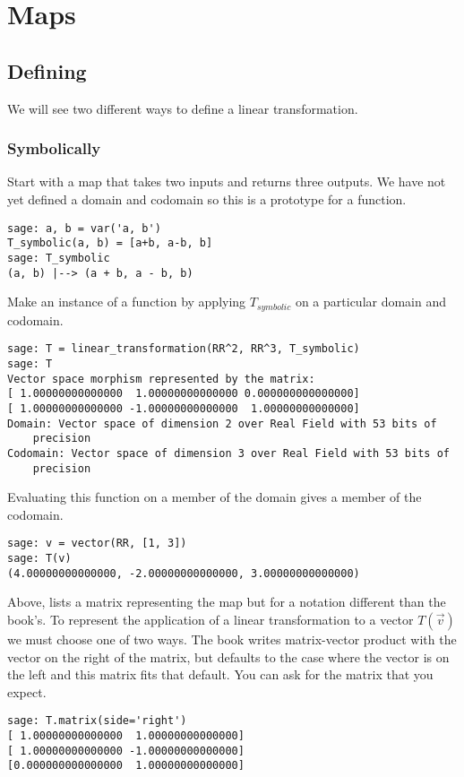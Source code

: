 \chapter{Maps}




\section{Defining}
We will see two different ways to define a linear transformation.

\subsection{Symbolically}
Start with a map that takes two inputs and returns three outputs.
We have not yet defined a domain and codomain 
so this is a prototype for a function.
\begin{lstlisting}
sage: a, b = var('a, b')   
T_symbolic(a, b) = [a+b, a-b, b]         
sage: T_symbolic       
(a, b) |--> (a + b, a - b, b)                
\end{lstlisting}
Make an instance of a function by applying $T_{\textit{symbolic}}$ on a 
particular domain and codomain.
\begin{lstlisting}
sage: T = linear_transformation(RR^2, RR^3, T_symbolic)
sage: T                                                
Vector space morphism represented by the matrix:
[ 1.00000000000000  1.00000000000000 0.000000000000000]
[ 1.00000000000000 -1.00000000000000  1.00000000000000]
Domain: Vector space of dimension 2 over Real Field with 53 bits of 
    precision
Codomain: Vector space of dimension 3 over Real Field with 53 bits of 
    precision
\end{lstlisting}
Evaluating this function on a member of the domain gives a member
of the codomain. 
\begin{lstlisting}
sage: v = vector(RR, [1, 3])  
sage: T(v)
(4.00000000000000, -2.00000000000000, 3.00000000000000)
\end{lstlisting}

Above, \Sage{} lists a matrix representing the map but 
for a notation different than the book's.
To represent the application of a 
linear transformation to a vector $T(\vec{v})$ we must choose
one of two ways.
The book writes matrix-vector product with the vector on the right of the 
matrix, but \Sage{} defaults to the case where the vector is on the left
and this matrix fits that default.
You can ask for the matrix that you expect. 
\begin{lstlisting}
sage: T.matrix(side='right')
[ 1.00000000000000  1.00000000000000]
[ 1.00000000000000 -1.00000000000000]
[0.000000000000000  1.00000000000000]  
\end{lstlisting}

